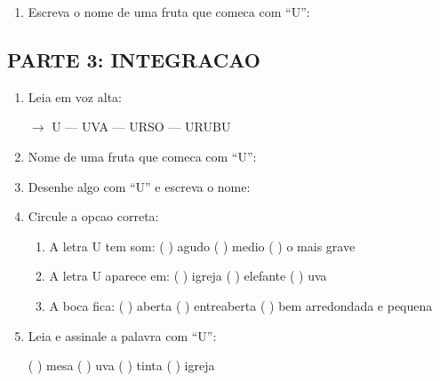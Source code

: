 \begin{exercicio}
\begin{enumerate}[resume]
  \item Escreva o nome de uma fruta que comeca com ``U'':
  \begin{center}
  \underline{\hspace{6cm}}
  \end{center}
\end{enumerate}

\subsection*{PARTE 3: INTEGRACAO}

\begin{enumerate}[resume]
  \item Leia em voz alta:
  \begin{center}
  $\rightarrow$ U --- UVA --- URSO --- URUBU
  \end{center}

  \item Nome de uma fruta que comeca com ``U'':
  \begin{center}
  \underline{\hspace{6cm}}
  \end{center}

  \item Desenhe algo com ``U'' e escreva o nome:
  \begin{center}
  \end{center}

  \item Circule a opcao correta:
  \begin{enumerate}[label=(\alph*)]
    \item A letra U tem som: ( ) agudo ( ) medio ( ) o mais grave
    \item A letra U aparece em: ( ) igreja ( ) elefante ( ) uva
    \item A boca fica: ( ) aberta ( ) entreaberta ( ) bem arredondada e pequena
  \end{enumerate}

  \item Leia e assinale a palavra com ``U'':
  \begin{center}
  ( ) mesa \quad ( ) uva \quad ( ) tinta \quad ( ) igreja
  \end{center}
\end{enumerate}
\end{exercicio}

